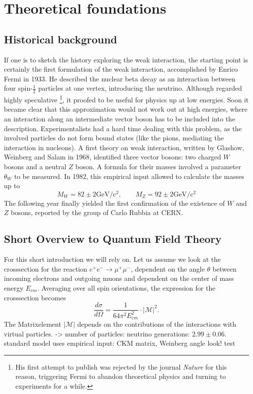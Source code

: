 \section{Theoretical foundations}
\subsection{Historical background}
If one is to sketch the history exploring the weak interaction, 
the starting point is certainly the first formulation of the 
weak interaction, accomplished by Enrico Fermi in 1933. 
He described the nuclear beta decay as an interaction 
between four spin-$\frac{1}{2}$ particles at one vertex, 
introducing the neutrino. Although regarded highly speculative%
\footnote{His first attempt to publish was rejected by the journal
\emph{Nature} for this reason, triggering Fermi to abandon 
theoretical physics and turning to experiments for a while.}, 
it proofed to be useful for physics up at low energies. 
Soon it became clear that this approximation would not work out 
at high energies, where an interaction along an intermediate 
vector boson has to be included into the description. 
Experimentalists had a hard time dealing with this problem, 
as the involved particles do not form bound states (like the 
pions, mediating the interaction in nucleons). A first theory
on weak interaction, written by Glashow, Weinberg and Salam 
in 1968, identified three vector bosons: two charged $W$ bosons 
and a neutral $Z$ boson. A formula for their masses involved a 
parameter $\theta_W$ to be measured. In 1982, this empirical 
input allowed to calculate the masses up to
\begin{equation}
    M_W = 82 \pm 2 \mathrm{GeV / c^2},\qquad 
    M_Z = 92 \pm 2 \mathrm{GeV / c^2}
\end{equation}
The following year finally yielded the first confirmation 
of the existence of $W$ and $Z$ bosons, reported by the group 
of Carlo Rubbia at CERN\@.

\subsection{Short Overview to Quantum Field Theory}
\label{sub:short_overview_to_quantum_field_theory}
For this short introduction we will rely on\cite{schroeder}. Let us assume we look at the crosssection
for the reaction $e^+ e^- \rightarrow \mu^+ \mu^-$, dependent on the angle $\theta$ between incoming electrons and 
outgoing muons and dependent on the center of mass energy $E_{cm}$. Averaging over all spin orientations, 
the expression for the crosssection becomes
\begin{equation}
    \frac{d\sigma}{d\Omega} = \frac{1}{64\pi^2 E_{cm}^2} \cdot \left| \mathcal{M} \right|^2.
\end{equation}
The Matrixelement $\left| \mathcal{M} \right|$ depends on the contributions of the interactions with virtual particles.
-> number of particles: neutrino generations: $2.99 \pm 0.06$. 
standard model uses empirical input: CKM matrix, Weinberg angle
look!\cite{pdg} test



